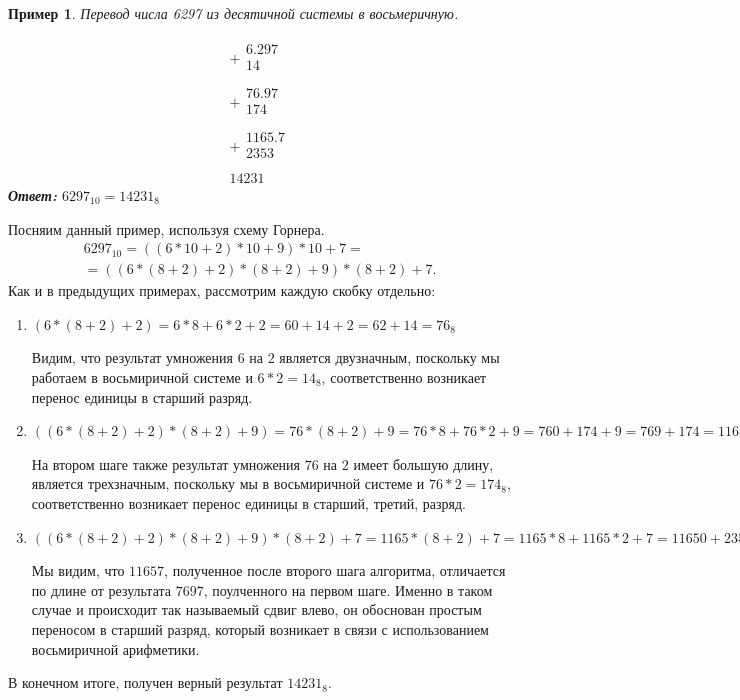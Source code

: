 \documentclass[14pt, russian]{scrartcl}
\newcounter{cExample}
\newtheorem{Example}{Пример}[cExample]
\begin{document}
\begin{Example}\label{Example:MathFont18}
Перевод числа 6297 из десятичной системы в восьмеричную. 

$$
\begin{array}{r}
+
\begin{array}{r}
6.297\\
14\,\,\,\,\,\,\,\,\\
\end{array} \\
\hline
+
\begin{array}{r}
76.97\\
174\,\,\,\,\,\,\\
\end{array} \\
\hline
+
\begin{array}{r}
1165.7\\
2353\\
\end{array} \\
\hline
14231\,\,\,
\end{array}
$$
\textbf{Ответ:} $6297_{10} = 14231_8$ 
\end{Example} 


Посняим данный пример, используя схему Горнера.
\label{Example:MathFont19} 
\begin{equation*}\label{eq:19}
\begin{aligned}
6297_{10} = ((6*10 + 2)*10 +9)*10 + 7 = \\
= ((6*(8+2) + 2)*(8+2) +9)*(8+2) + 7.
\end{aligned}
\end{equation*}
Как и в предыдущих примерах, рассмотрим каждую скобку отдельно:
\begin{enumerate}
    \item $(6*(8+2) + 2) = 6 * 8 + 6 * 2 + 2 = 60 + 14 + 2 = 62 + 14 = 76_8$
    
    Видим, что результат умножения $6$ на $2$ является двузначным, поскольку мы работаем в восьмиричной системе и $6 * 2 = 14_8$, соответственно возникает перенос единицы в старший разряд.
    \item $((6*(8+2) + 2)*(8+2) +9) = 76 *(8+2) + 9 = 76 * 8 + 76 * 2 + 9 = 760 + 174 + 9 =  769 + 174 = 1165_8$
    
    На втором шаге также результат умножения $76$ на $2$ имеет большую длину, является трехзначным, поскольку мы в восьмиричной системе и $76 * 2 = 174_8$, соответственно возникает перенос единицы в старший, третий, разряд.
    \item $((6*(8+2) + 2)*(8+2) +9)*(8+2) + 7 = 1165 * (8 + 2) + 7 = 1165 * 8 + 1165 * 2 + 7 = 11650 + 2352 + 7 =  11657 + 2352 = 14231_8$
    
    Мы видим, что $11657$, полученное после второго шага алгоритма, отличается по длине от результата $7697$, поулченного на первом шаге. Именно в таком случае и происходит так называемый сдвиг влево, он обоснован простым переносом в старший разряд, который возникает в связи с использованием восьмиричной арифметики.
\end{enumerate}
\vspace{0.2em}
В конечном итоге, получен верный результат $14231_8$.
\end{document}
